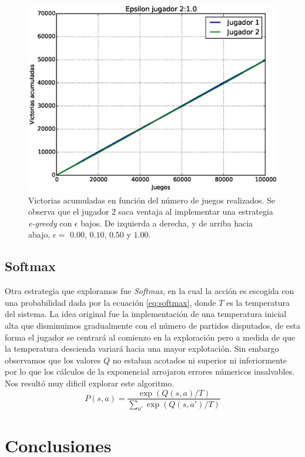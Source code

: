 \documentclass[11pt, spanish]{article}
\begin{document}
\begin{figure}
\includegraphics[scale = 0.3]{figuras/Epsilon10.eps}
\caption{Victorias acumuladas en función del número de juegos realizados. Se 
observa que el jugador 2 saca ventaja al implementar una estrategia 
\emph{e-greedy} con $\epsilon$ bajos. De izquierda a derecha, y de arriba hacia 
abajo, $\epsilon = $ $0.00$, $0.10$, $0.50$ y $1.00$.}
\label{fig:e_greedy}
\end{figure}

\subsection{Softmax}
\par Otra estrategia que exploramos fue \emph{Softmax}, en la cual la acción es 
escogida con una probabilidad dada por la ecuación \ref{eq:softmax}, donde 
$T$ es la temperatura del sistema. La idea original fue la implementación de 
una temperatura inicial alta que disminuimos gradualmente con el número de 
partidos disputados, de esta forma el jugador se centrará al comienzo en la 
exploración pero a medida de que la temperatura descienda variará hacia una 
mayor explotación. Sin embargo observamos que los valores $Q$ no estaban 
acotados ni superior ni inferiormente por lo que los cálculos de la 
exponencial arrojaron errores númericos insalvables. Nos resultó 
muy dificil explorar este algoritmo.
\begin{equation}
P(s,a) = \frac{\exp(Q(s,a)/T)}{\sum_{a'}{\exp(Q(s,a')/T)}}
\label{eq:softmax}
\end{equation}

\section{Conclusiones}
\end{document}
